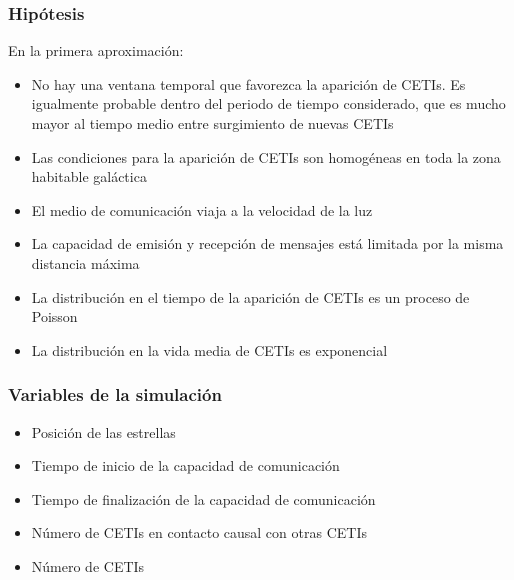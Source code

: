 \documentclass[handout]{beamer}
\theoremstyle{plain}
\theoremstyle{definition}
\theoremstyle{remark}
\begin{document}
\begin{frame}\frametitle{Hipótesis}

   En la primera aproximación:

   \begin{itemize}
      \item No hay una ventana temporal que favorezca la aparición de
         CETIs.   Es igualmente probable dentro del periodo de tiempo
         considerado, que es mucho mayor al tiempo medio entre
         surgimiento de nuevas CETIs
      \item Las condiciones para la aparición de CETIs son homogéneas
         en toda la zona habitable galáctica
      \item El medio de comunicación viaja a la velocidad de la luz
      \item La capacidad de emisión y recepción de mensajes está
         limitada por la misma distancia máxima
      \item La distribución en el tiempo de la aparición de CETIs es
         un proceso de Poisson
      \item La distribución en la vida media de CETIs es exponencial
   \end{itemize}

\end{frame}%

\begin{frame}\frametitle{Variables de la simulación}

   \begin{itemize}
      \item Posición de las estrellas
      \item Tiempo de inicio de la capacidad de comunicación
      \item Tiempo de finalización de la capacidad de comunicación
      \item Número de CETIs en contacto causal con otras CETIs
      \item Número de CETIs
   \end{itemize}

\end{frame}%
 
\end{document}
